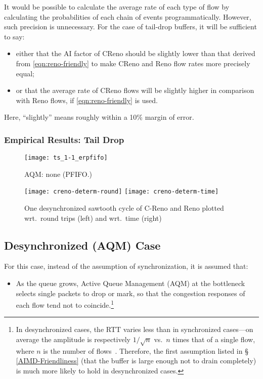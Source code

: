 It would be possible to calculate the average rate of each type of flow by calculating the probabilities of each chain of events programmatically. However, such precision is unnecessary. For the case of tail-drop buffers, it will be sufficient to say:
\begin{itemize}
	\item either that the AI factor of CReno should be slightly lower than that derived from \autoref{eqn:reno-friendly} to make CReno and Reno flow rates more precisely equal;
	\item or that the average rate of CReno flows will be slightly higher in comparison with Reno flows, if \autoref{eqn:reno-friendly} is used.
\end{itemize}
Here, ``slightly''  means roughly within a 10\% margin of error.


\subsubsection{Empirical Results: Tail Drop}\label{empirical-pfifo}

\begin{figure}
	\centering
	\texttt{[image: ts\_1-1\_erpfifo]}
	\caption{AQM: none (PFIFO.)}\label{fig:ts_1-1_erpfifo}
\end{figure}


\begin{figure*}
	\centering
	\texttt{[image: creno-determ-round]}
	\texttt{[image: creno-determ-time]}
	\caption{One desynchronized sawtooth cycle of C-Reno and Reno plotted wrt.\ round trips (left) and wrt.\ time (right)}\label{fig:creno-determ}
\end{figure*}
\subsection{Desynchronized (AQM) Case}\label{AQM}

For this case, instead of the assumption of synchronization, it is assumed that:
\begin{itemize}[nosep]
	\item As the queue grows, Active Queue Management (AQM) at the bottleneck selects single packets to drop or mark, so that the congestion responses of each flow tend not to coincide.\footnote{In desynchronized cases, the RTT varies less than in synchronized cases---on average the amplitude is respectively \(1/\sqrt{n}\) vs.\ \(n\) times that of a single flow, where \(n\) is the number of flows~\cite{Appenzeller04:Sizing_buffers}. Therefore, the first assumption listed in \S\,\ref{AIMD-Friendliness} (that the buffer is large enough not to drain completely) is much more likely to hold in desynchronized cases.}
\end{itemize}

